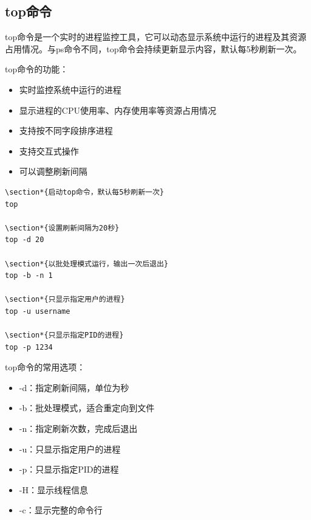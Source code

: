 \documentclass[12pt,UTF8]{ctexbook}
\begin{document}
\subsection{top命令}
top命令是一个实时的进程监控工具，它可以动态显示系统中运行的进程及其资源占用情况。与ps命令不同，top命令会持续更新显示内容，默认每5秒刷新一次。

top命令的功能：
\begin{itemize}
    \item 实时监控系统中运行的进程
    \item 显示进程的CPU使用率、内存使用率等资源占用情况
    \item 支持按不同字段排序进程
    \item 支持交互式操作
    \item 可以调整刷新间隔
\end{itemize}

\begin{verbatim}
\section*{启动top命令，默认每5秒刷新一次}
top

\section*{设置刷新间隔为20秒}
top -d 20

\section*{以批处理模式运行，输出一次后退出}
top -b -n 1

\section*{只显示指定用户的进程}
top -u username

\section*{只显示指定PID的进程}
top -p 1234
\end{verbatim}

top命令的常用选项：
\begin{itemize}
    \item -d：指定刷新间隔，单位为秒
    \item -b：批处理模式，适合重定向到文件
    \item -n：指定刷新次数，完成后退出
    \item -u：只显示指定用户的进程
    \item -p：只显示指定PID的进程
    \item -H：显示线程信息
    \item -c：显示完整的命令行
\end{itemize}
\end{document}
